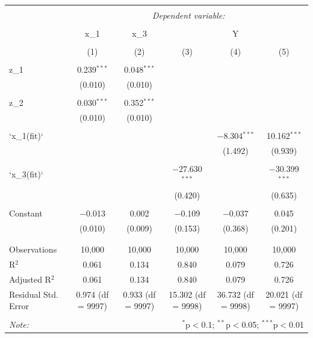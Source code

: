 \documentclass[
]{article}
\begin{document}
\begin{table}[!htbp] \centering 
  \caption{} 
  \label{} 
\begin{tabular}{@{\extracolsep{5pt}}lccccc} 
\\[-1.8ex]\hline 
\hline \\[-1.8ex] 
 & \multicolumn{5}{c}{\textit{Dependent variable:}} \\ 
\cline{2-6} 
\\[-1.8ex] & x\_1 & x\_3 & \multicolumn{3}{c}{Y} \\ 
\\[-1.8ex] & (1) & (2) & (3) & (4) & (5)\\ 
\hline \\[-1.8ex] 
 z\_1 & 0.239$^{***}$ & 0.048$^{***}$ &  &  &  \\ 
  & (0.010) & (0.010) &  &  &  \\ 
  & & & & & \\ 
 z\_2 & 0.030$^{***}$ & 0.352$^{***}$ &  &  &  \\ 
  & (0.010) & (0.010) &  &  &  \\ 
  & & & & & \\ 
 `x\_1(fit)` &  &  &  & $-$8.304$^{***}$ & 10.162$^{***}$ \\ 
  &  &  &  & (1.492) & (0.939) \\ 
  & & & & & \\ 
 `x\_3(fit)` &  &  & $-$27.630$^{***}$ &  & $-$30.399$^{***}$ \\ 
  &  &  & (0.420) &  & (0.635) \\ 
  & & & & & \\ 
 Constant & $-$0.013 & 0.002 & $-$0.109 & $-$0.037 & 0.045 \\ 
  & (0.010) & (0.009) & (0.153) & (0.368) & (0.201) \\ 
  & & & & & \\ 
\hline \\[-1.8ex] 
Observations & 10,000 & 10,000 & 10,000 & 10,000 & 10,000 \\ 
R$^{2}$ & 0.061 & 0.134 & 0.840 & 0.079 & 0.726 \\ 
Adjusted R$^{2}$ & 0.061 & 0.134 & 0.840 & 0.079 & 0.726 \\ 
Residual Std. Error & 0.974 (df = 9997) & 0.933 (df = 9997) & 15.302 (df = 9998) & 36.732 (df = 9998) & 20.021 (df = 9997) \\ 
\hline 
\hline \\[-1.8ex] 
\textit{Note:}  & \multicolumn{5}{r}{$^{*}$p$<$0.1; $^{**}$p$<$0.05; $^{***}$p$<$0.01} \\ 
\end{tabular} 
\end{table}
\end{document}
